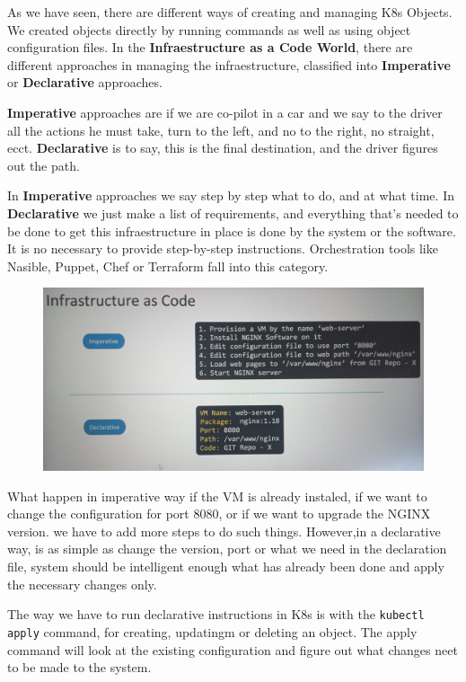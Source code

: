\documentclass{article}
\begin{document}
As we have seen, there are different ways of creating and managing K8s Objects. We created objects directly by running commands as well as using object configuration files. In the \textbf{Infraestructure as a Code World}, there are different approaches in managing the infraestructure, classified into \textbf{Imperative} or \textbf{Declarative} approaches.

\textbf{Imperative} approaches are if we are co-pilot in a car and we say to the driver all the actions he must take, turn to the left, and no to the right, no straight, ecct. \textbf{Declarative} is to say, this is the final destination, and the driver figures out the path.

In \textbf{Imperative} approaches we say step by step what to do, and at what time. In \textbf{Declarative} we just make a list of requirements, and everything that's needed to be done to get this infraestructure in place is done by the system or the software. It is no necessary to provide step-by-step instructions. Orchestration tools like Nasible, Puppet, Chef or Terraform fall into this category.

\begin{figure}[H]
    \centering
    \includegraphics[width=\textwidth]{pictures/impdec.jpeg}
\end{figure}

What happen in imperative way if the VM is already instaled, if we want to change the configuration for port 8080, or if we want to upgrade the NGINX version. we have to add more steps to do such things. However,in a declarative way, is as simple as change the version, port or what we need in the declaration file, system should be intelligent enough what has already been done and apply the necessary changes only.

The way we have to run declarative instructions in K8s is with the \verb|kubectl apply| command, for creating, updatingm or deleting an object. The apply command will look at the existing configuration and figure out what changes neet to be made to the system.
\end{document}
